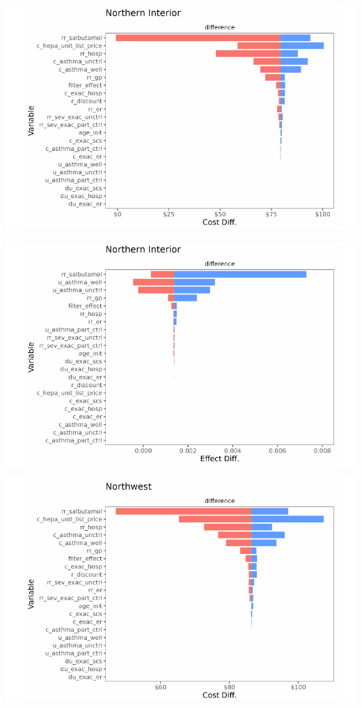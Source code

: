 \documentclass[
  number]{elsarticle}
\begin{document}
\includegraphics{index_files/figure-pdf/unnamed-chunk-9-19.pdf}

\includegraphics{index_files/figure-pdf/unnamed-chunk-9-20.pdf}

\includegraphics{index_files/figure-pdf/unnamed-chunk-9-21.pdf}
\end{document}
